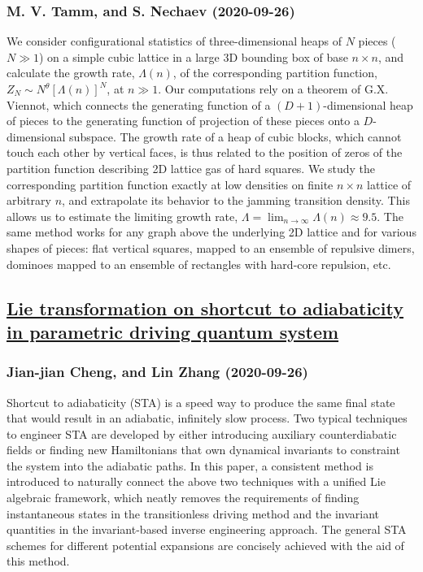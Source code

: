 \subsubsection*{M. V. Tamm, and S. Nechaev (2020-09-26)}
We consider configurational statistics of three-dimensional heaps of $N$
pieces ($N\gg 1$) on a simple cubic lattice in a large 3D bounding box of base
$n \times n$, and calculate the growth rate, $\Lambda(n)$, of the corresponding
partition function, $Z_N\sim N^{\theta}[\Lambda(n)]^N$, at $n\gg 1$. Our
computations rely on a theorem of G.X. Viennot, which connects the generating
function of a $(D+1)$-dimensional heap of pieces to the generating function of
projection of these pieces onto a $D$-dimensional subspace. The growth rate of
a heap of cubic blocks, which cannot touch each other by vertical faces, is
thus related to the position of zeros of the partition function describing 2D
lattice gas of hard squares. We study the corresponding partition function
exactly at low densities on finite $n\times n$ lattice of arbitrary $n$, and
extrapolate its behavior to the jamming transition density. This allows us to
estimate the limiting growth rate, $\Lambda =\lim_{n\to\infty}\Lambda(n)\approx
9.5$. The same method works for any graph above the underlying 2D lattice and
for various shapes of pieces: flat vertical squares, mapped to an ensemble of
repulsive dimers, dominoes mapped to an ensemble of rectangles with hard-core
repulsion, etc.

\subsection*{\href{http://arxiv.org/abs/2009.12538v1}{Lie transformation on shortcut to adiabaticity in parametric driving  quantum system}}
\subsubsection*{Jian-jian Cheng, and Lin Zhang (2020-09-26)}
Shortcut to adiabaticity (STA) is a speed way to produce the same final state
that would result in an adiabatic, infinitely slow process. Two typical
techniques to engineer STA are developed by either introducing auxiliary
counterdiabatic fields or finding new Hamiltonians that own dynamical
invariants to constraint the system into the adiabatic paths. In this paper, a
consistent method is introduced to naturally connect the above two techniques
with a unified Lie algebraic framework, which neatly removes the requirements
of finding instantaneous states in the transitionless driving method and the
invariant quantities in the invariant-based inverse engineering approach. The
general STA schemes for different potential expansions are concisely achieved
with the aid of this method.


